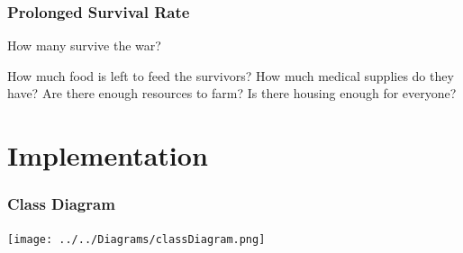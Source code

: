\documentclass[ascpectratio=169]{beamer}
\begin{document}
\begin{frame}

  \frametitle{Prolonged Survival Rate}

  \begin{center}
    {\large How many survive the war?}
  \end{center}

  \begin{outline}
    \1 How much food is left to feed the survivors?
    \1 How much medical supplies do they have?
    \1 Are there enough resources to farm?
    \1 Is there housing enough for everyone?
  \end{outline}

\end{frame}


\section{Implementation}


\begin{frame}

  \frametitle{Class Diagram}

  \begin{center}
    \texttt{[image: ../../Diagrams/classDiagram.png]}
  \end{center}

\end{frame}

\end{document}
